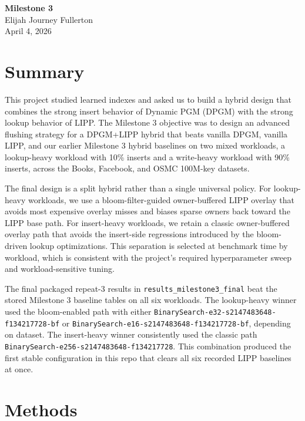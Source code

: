 \documentclass[11pt]{article}
\begin{document}
\begin{center}
{\LARGE \textbf{Milestone 3}}\\[0.5em]
{\large Elijah Journey Fullerton}\\
{\large April 4, 2026}
\end{center}

\section{Summary}
This project studied learned indexes and asked us to build a hybrid design that combines the strong insert behavior of Dynamic PGM (DPGM) with the strong lookup behavior of LIPP. The Milestone 3 objective was to design an advanced flushing strategy for a DPGM+LIPP hybrid that beats vanilla DPGM, vanilla LIPP, and our earlier Milestone 3 hybrid baselines on two mixed workloads, a lookup-heavy workload with 10\% inserts and a write-heavy workload with 90\% inserts, across the Books, Facebook, and OSMC 100M-key datasets.

The final design is a split hybrid rather than a single universal policy. For lookup-heavy workloads, we use a bloom-filter-guided owner-buffered LIPP overlay that avoids most expensive overlay misses and biases sparse owners back toward the LIPP base path. For insert-heavy workloads, we retain a classic owner-buffered overlay path that avoids the insert-side regressions introduced by the bloom-driven lookup optimizations. This separation is selected at benchmark time by workload, which is consistent with the project's required hyperparameter sweep and workload-sensitive tuning.

The final packaged repeat-3 results in \texttt{results\_milestone3\_final} beat the stored Milestone 3 baseline tables on all six workloads. The lookup-heavy winner used the bloom-enabled path with either \texttt{BinarySearch-e32-s2147483648-f134217728-bf} or \texttt{BinarySearch-e16-s2147483648-f134217728-bf}, depending on dataset. The insert-heavy winner consistently used the classic path \texttt{BinarySearch-e256-s2147483648-f134217728}. This combination produced the first stable configuration in this repo that clears all six recorded LIPP baselines at once.

\section{Methods}
\end{document}

